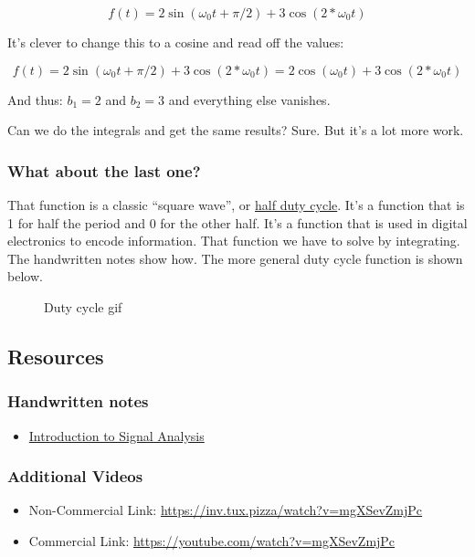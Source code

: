 \[f(t) = 2\sin(\omega_0 t+\pi/2) + 3\cos(2*\omega_0t)\]

It's clever to change this to a cosine and read off the values:

\[f(t) = 2\sin(\omega_0 t+\pi/2) + 3\cos(2*\omega_0t) = 2\cos(\omega_0 t) + 3\cos(2*\omega_0t)\]

And thus: \(b_1 = 2\) and \(b_2=3\) and everything else vanishes.

Can we do the integrals and get the same results? Sure. But it's a lot
more work.

\subsubsection{What about the last one?}\label{what-about-the-last-one}

That function is a classic ``square wave'', or
\href{https://en.wikipedia.org/wiki/Duty_cycle}{half duty cycle}. It's a
function that is 1 for half the period and 0 for the other half. It's a
function that is used in digital electronics to encode information. That
function we have to solve by integrating. The handwritten notes show
how. The more general duty cycle function is shown below.

\begin{figure}
\centering
{}
\caption{Duty cycle gif}
\end{figure}

\subsection{Resources}\label{resources}

\subsubsection{Handwritten notes}\label{handwritten-notes}

\begin{itemize}
\tightlist
\item
  \href{../assets/notes/Notes-Fourier_Example.pdf}{Introduction to
  Signal Analysis}
\end{itemize}

\subsubsection{Additional Videos}\label{additional-videos}

\href{https://inv.tux.pizza/watch?v=mgXSevZmjPc}{\pandocbounded{\texttt{[image: https://markdown-videos-api.jorgenkh.no/youtube/mgXSevZmjPc?width=720\&height=405]}}}

\begin{itemize}
\tightlist
\item
  Non-Commercial Link: \url{https://inv.tux.pizza/watch?v=mgXSevZmjPc}
\item
  Commercial Link: \url{https://youtube.com/watch?v=mgXSevZmjPc}
\end{itemize}
